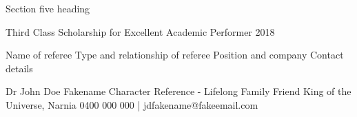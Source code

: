 \begin{tmrsection}{Section five heading}

\tmrshortentry
 	 {Third Class Scholarship for Excellent Academic Performer}
 	 {}
 	 {2018}
 	 {}
  	
\tmrshortentry
 	 {Name of referee}
 	 {Type and relationship of referee}
 	 {Position and company}
 	 {Contact details}
    
\tmrshortentry
 	 {Dr John Doe Fakename}
 	 {Character Reference - Lifelong Family Friend}
 	 {King of the Universe, Narnia}
 	 {0400 000 000 | jdfakename@fakeemail.com}
	
\end{tmrsection}